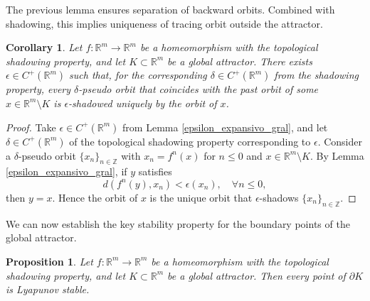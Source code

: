\documentclass{amsart}
\newtheorem{prop}{Proposition}
\newtheorem{clly}{Corollary}
\newcommand{\R}{{\mathbb{R}}}
\newcommand{\Z}{{\mathbb{Z}}}
\begin{document}
	
	
	
	The previous lemma ensures separation of backward orbits. Combined with shadowing, this implies uniqueness of  tracing orbit outside the attractor.
	
	\begin{clly}\label{cor:epsilon_expansivo}
		Let $f:\R^m\to \R^m$ be a homeomorphism with the topological shadowing property, and let $K\subset \R^m$ be a global attractor.  
		There exists $\epsilon\in C^+(\R^m)$ such that, for the corresponding $\delta\in C^+(\R^m)$ from the shadowing property, every $\delta$-pseudo orbit that coincides with the past orbit of some $x\in \R^m\setminus K$ is $\epsilon$-shadowed uniquely by the orbit of $x$.
	\end{clly}
	
	\begin{proof}
		Take $\epsilon\in C^+(\R^m)$ from Lemma \ref{epsilon_expansivo_gral}, and let $\delta\in C^+(\R^m)$ of the topological shadowing property corresponding to $\epsilon$.  
		Consider a $\delta$-pseudo orbit $\{x_n\}_{n\in \Z}$ with $x_n=f^n(x)$ for $n\leq0$ and $x\in \R^m\setminus K$.  
		By Lemma \ref{epsilon_expansivo_gral}, if $y$ satisfies  
		\[
		d(f^n(y),x_n)<\epsilon(x_n),\quad \forall n\leq0,
		\]  
		then $y=x$.  
		Hence the orbit of $x$ is the unique orbit that $\epsilon$-shadows $\{x_n\}_{n\in \Z}$.
	\end{proof}
	
	
	
	
	We can now establish the key stability property for the boundary points of the global attractor.
	
	\begin{prop}\label{Lyap_est}
		Let $f:\R^m\to \R^m$ be a homeomorphism with the topological shadowing property, and let $K\subset \R^m$ be a global attractor.  
		Then every point of $\partial K$ is Lyapunov stable.
	\end{prop}
	
\end{document}
